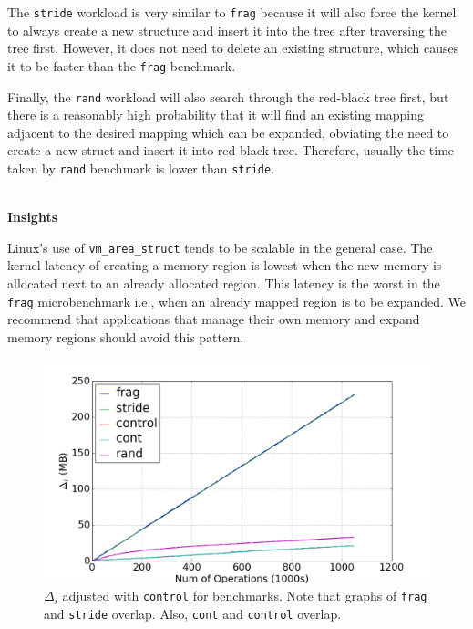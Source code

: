 \documentclass[twocolumn,11pt]{article}
\begin{document}
The \texttt{stride} workload is very similar to \texttt{frag} because it will also force the
kernel to always create a new structure and insert it into the tree after
traversing the tree first. However, it does not need to delete an existing
structure, which causes it to be faster than the \texttt{frag} benchmark.

Finally, the \texttt{rand} workload will also search through the red-black tree first,
but there is a reasonably high probability that it will find an existing
mapping adjacent to the desired mapping which can be expanded, obviating the
need to create a new struct and insert it into red-black tree. Therefore, usually
the time taken by \texttt{rand} benchmark is lower than \texttt{stride}.


~\\ \textbf{Insights}

Linux's use of \texttt{vm\_area\_struct} tends to be scalable in the general
case. The kernel latency of creating a memory region is lowest when the new
memory is allocated next to an already allocated region. This latency is the
worst in the \texttt{frag} microbenchmark i.e., when an already mapped region
is to be expanded.  We recommend that applications that manage their own memory
and expand memory regions should avoid this pattern.

\begin{figure}[t]
    \includegraphics[width=\columnwidth]{figures/mmap_mem_usage}
    \caption{$\Delta_i$ adjusted with \texttt{control} for benchmarks. Note that
    graphs of \texttt{frag} and \texttt{stride} overlap. Also, \texttt{cont} and
    \texttt{control} overlap.}
    \label{fig:mmap_mem_usage}
\end{figure}
\end{document}
